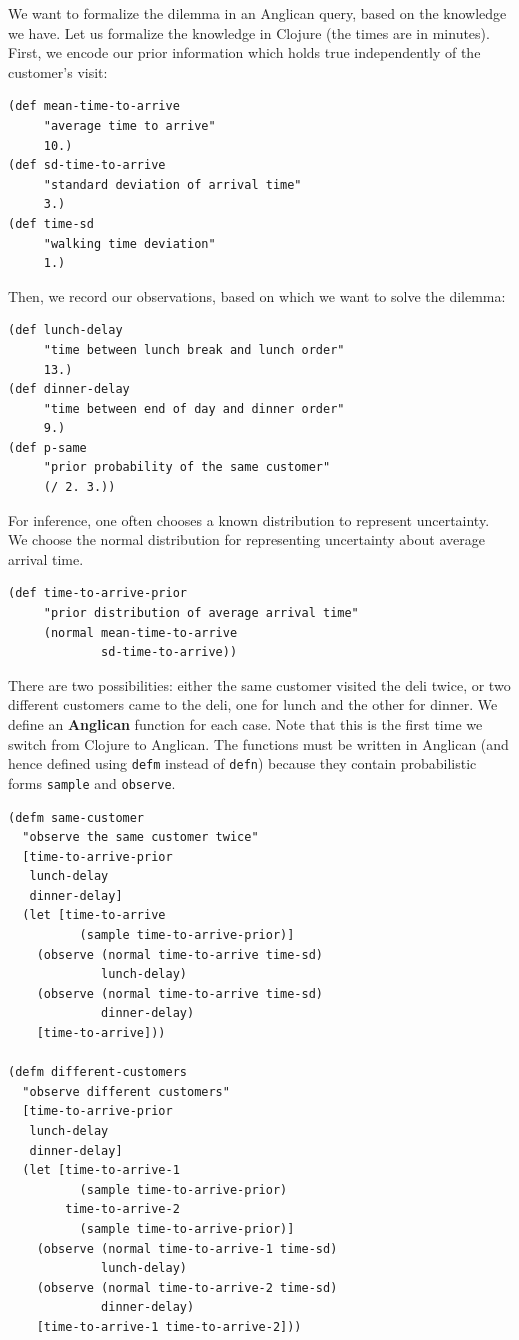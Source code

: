 \documentclass[preprint]{sigplanconf}
\begin{document}
We want to formalize the dilemma in an Anglican query, based on
the knowledge we have. Let us formalize the knowledge in
Clojure (the times are in minutes). First, we encode our prior
information which holds true independently of the customer's
visit:

\begin{lstlisting}[style=default]
(def mean-time-to-arrive
     "average time to arrive"
     10.)
(def sd-time-to-arrive
     "standard deviation of arrival time"
     3.)
(def time-sd
     "walking time deviation"
     1.)
\end{lstlisting}

Then, we record our observations, based on which we want to
solve the dilemma:

\begin{lstlisting}[style=default]
(def lunch-delay
     "time between lunch break and lunch order"
     13.)
(def dinner-delay
     "time between end of day and dinner order"
     9.)
(def p-same
     "prior probability of the same customer"
     (/ 2. 3.))
\end{lstlisting}


For inference, one often chooses a known distribution to
represent uncertainty. We choose the normal
distribution for representing uncertainty about average arrival
time.

\begin{lstlisting}[style=default]
(def time-to-arrive-prior 
     "prior distribution of average arrival time"
     (normal mean-time-to-arrive
             sd-time-to-arrive))
\end{lstlisting}

There are two possibilities: either the same customer visited
the deli twice, or two different customers came to the deli,
one for lunch and the other for dinner. We define an \textbf{Anglican} function
for each case. Note that this is the first time we switch from
Clojure to Anglican. The functions must be written in Anglican
(and hence defined using \texttt{defm} instead of \texttt{defn})
because they contain probabilistic forms \texttt{sample} and
\texttt{observe}.

\begin{lstlisting}[style=default]
(defm same-customer 
  "observe the same customer twice"
  [time-to-arrive-prior
   lunch-delay
   dinner-delay]
  (let [time-to-arrive
          (sample time-to-arrive-prior)]
    (observe (normal time-to-arrive time-sd) 
             lunch-delay)
    (observe (normal time-to-arrive time-sd)
             dinner-delay)
    [time-to-arrive]))

(defm different-customers
  "observe different customers"
  [time-to-arrive-prior
   lunch-delay
   dinner-delay]
  (let [time-to-arrive-1
          (sample time-to-arrive-prior)
        time-to-arrive-2
          (sample time-to-arrive-prior)]
    (observe (normal time-to-arrive-1 time-sd) 
             lunch-delay)
    (observe (normal time-to-arrive-2 time-sd)
             dinner-delay)
    [time-to-arrive-1 time-to-arrive-2]))
\end{lstlisting}
\end{document}
